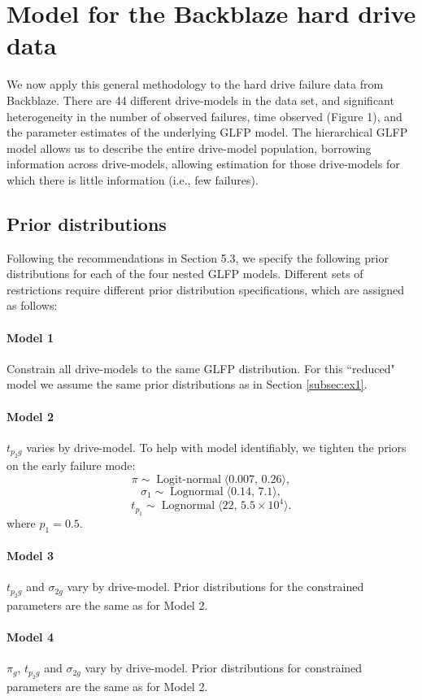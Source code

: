 \documentclass[11pt]{article}
\newcommand{\op}{\operatorname}
\begin{document}
\section{Model for the Backblaze hard drive data}
\label{sec:Data analysis}
We now apply this general methodology to the hard drive failure data from Backblaze.  There are 44 different drive-models in the data set, and significant heterogeneity in the number of observed failures, time observed (Figure 1), and the parameter estimates of the underlying GLFP model. The hierarchical GLFP model allows us to describe the entire drive-model population, borrowing information across drive-models, allowing estimation for those drive-models for which there is little information (i.e., few failures). 

\subsection{Prior distributions}
\label{sec:Prior distributions}
Following the recommendations in Section 5.3, we specify the following prior distributions for each of the four nested GLFP models. Different sets of restrictions require different prior distribution specifications, which are assigned as follows:

\paragraph{Model 1} Constrain all drive-models to the same GLFP distribution. For this ``reduced" model we assume the same prior distributions as in Section \ref{subsec:ex1}.

\paragraph{Model 2} $t_{p_{2}g}$ varies by drive-model. To help with model identifiably, we tighten the priors on the early failure mode:
$$ \pi \sim \op{Logit-normal}\langle 0.007,\, 0.26 \rangle,$$
$$\sigma_1 \sim \op{Lognormal}\langle 0.14,\, 7.1\rangle,$$ 
$$t_{p_1} \sim \op{Lognormal} \langle 22,\, 5.5 \times 10^{4} \rangle.$$
where $p_{1}=0.5$.

\paragraph{Model 3} $t_{p_{2}g}$ and $\sigma_{2g}$ vary by drive-model. Prior distributions for the constrained parameters are the same as for Model 2.

\paragraph{Model 4} $\pi_g$, $t_{p_{2}g}$ and $\sigma_{2g}$ vary by drive-model. Prior distributions for constrained parameters are the same as for Model 2.
\end{document}
